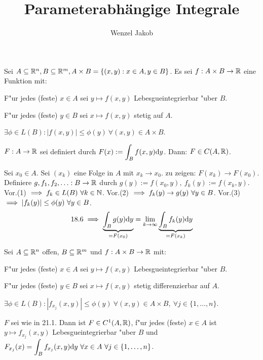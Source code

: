 \documentclass{article}
\title{Parameterabhängige Integrale}
\author{Wenzel Jakob}
\begin{document}
\maketitle

\begin{satz}
Sei $A\subseteq\mathbb{R}^n, B\subseteq\mathbb{R}^m, A\times B=\{(x,y):x\in A, y\in B\}$.
Es sei $f:A\times B\to\mathbb{R}$ eine Funktion mit:
\begin{liste}
\item F"ur jedes (feste) $x\in A$ sei $y\mapsto f(x,y)$ Lebesgueintegrierbar "uber $B$.
\item F"ur jedes (feste) $y\in B$ sei $x\mapsto f(x,y)$ stetig auf $A$.
\item $\exists \phi\in L(B): |f(x,y)|\le \phi(y)\ \forall (x,y)\in A\times B$.
\end{liste}
$F:A\to\mathbb{R}$ sei definiert durch $F(x):=\displaystyle\int_B f(x,y)\text{d}y$. Dann: $F\in C(A,\mathbb{R})$.
\end{satz}

\begin{beweis}
Sei $x_0\in A$. Sei $(x_k)$ eine Folge in $A$ mit $x_k\to x_0$. zu zeigen: $F(x_k)\to F(x_0)$.\\
Definiere $g,f_1,f_2,\ldots:B\to\mathbb{R}$ durch $g(y):=f(x_0,y),\ f_k(y):=f(x_k,y)$.
Vor.(1) $\implies f_k\in L(B)\ \forall k\in \mathbb{N}$.
Vor.(2) $\folgt f_k(y)\to g(y)\ \forall y\in B$.
Vor.(3) $\implies |f_k(y)|\le \phi(y)\ \forall y\in B$.
\[18.6 \implies \underbrace{\displaystyle\int_B g(y)\text{d}y}_{=F(x_0)}=\lim_{k\to\infty}\underbrace{\int_B f_k(y)\text{d}y}_{=F(x_k)}\]
\end{beweis}

\begin{satz}
Sei $A\subseteq \mathbb{R}^n$ offen, $B\subseteq\mathbb{R}^m$ und $f:A\times B\to\mathbb{R}$ mit:
\begin{liste}
\item F"ur jedes (feste) $x \in A$ sei $y\mapsto f(x,y)$ Lebesgueintegrierbar "uber $B$.
	\item F"ur jedes (feste) $y \in B$ sei $x\mapsto f(x,y)$ stetig differenzierbar auf $A$.
\item $\exists \phi\in L(B): |f_{x_j}(x,y)|\le\phi(y)\ \forall (x,y)\in A\times B,\ \forall j\in\{1,\ldots,n\}$.
\end{liste}
$F$ sei wie in 21.1. Dann ist $F\in C^1(A,\mathbb{R})$, f"ur jedes (feste) $x\in A$ ist $y\mapsto f_{x_j}(x,y)$ Lebesgueintegrierbar "uber $B$ und $F_{x_j}(x)=\displaystyle\int_B f_{x_j}(x,y)\text{d}y\ \forall x\in A\ \forall j\in \{1,\ldots,n\}$.
\end{satz}
\end{document}
